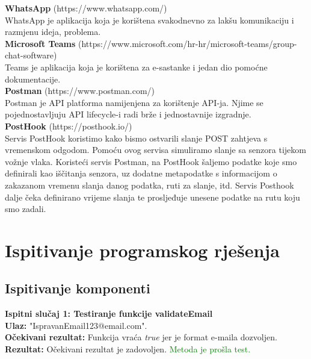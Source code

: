 {			{\textbf{WhatsApp} (https://www.whatsapp.com/)}\\

	{WhatsApp je aplikacija koja je korištena svakodnevno za lakšu komunikaciju i razmjenu ideja, problema.}\\

			{\textbf{Microsoft Teams} (https://www.microsoft.com/hr-hr/microsoft-teams/group-chat-software)}\\

	{Teams je aplikacija koja je korištena za e-sastanke i jedan dio pomoćne dokumentacije.}\\

	{\textbf{Postman} (https://www.postman.com/)}\\
			
	{Postman je API platforma namijenjena za korištenje API-ja. Njime se pojednostavljuju API lifecycle-i radi brže i jednostavnije izgradnje.}\\

	{\textbf{PostHook} (https://posthook.io/)}\\

	{Servis PostHook koristimo kako bismo ostvarili slanje POST zahtjeva s vremenskom odgodom. Pomoću ovog servisa simuliramo slanje sa senzora tijekom vožnje vlaka. Koristeći servis Postman, na PostHook šaljemo podatke koje smo definirali kao iščitanja senzora, uz dodatne metapodatke s informacijom o zakazanom vremenu slanja danog podatka, ruti za slanje, itd. Servis Posthook dalje čeka definirano vrijeme slanja te prosljeđuje unesene podatke na rutu koju smo zadali. }


			\eject 
		
	
		\section{Ispitivanje programskog rješenja}
			
			\subsection{Ispitivanje komponenti}
		
			
			\noindent \textbf {Ispitni slučaj 1: Testiranje funkcije validateEmail}\\
			\noindent \textbf {Ulaz:} "IspravanEmail123@email.com".\\
			\noindent \textbf {Očekivani rezultat:} Funkcija vraća \textit{true} jer je format e-maila dozvoljen.\\
			\noindent \textbf {Rezultat:} Očekivani rezultat je zadovoljen. \textcolor{green}{Metoda je prošla test.}\\
			
}

